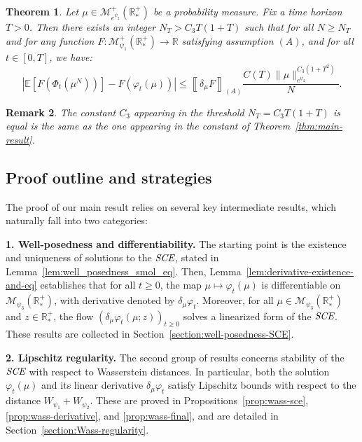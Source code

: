 \documentclass[11pt,a4paper]{article}
\newcommand{\RR}{\mathbb{R}}
\newcommand{\RRP}{\mathbb{R}^+_*}
\newcommand{\MC}{\mathcal{M}}
\newcommand{\SCE}{\emph{SCE}}
\newcommand{\A}{(A)}
\newcommand{\Proc}[1]{\left(#1\right)_{t\geq 0}}
\newtheorem{theorem}{Theorem}[section]
\newtheorem{remark}[theorem]{Remark}
\begin{document}
\begin{theorem}\label{thm:main-result-2}
    Let $\mu \in \MC^+_{e^{\psi_2}}(\RRP)$ be a probability measure. Fix a time horizon $T > 0$. Then there exists an integer $N_T > C_3 T(1 + T)$ such that for all $N \geq N_T$ and for any function \(F : \MC^+_{\psi_1}(\RRP) \to \RR\) satisfying assumption \(\A\), and for all \(t \in [0, T]\), we have:
    \[
    \left| \mathbb{E}\left[F\left(\Phi_t\left(\mu^N\right)\right)\right] - F\left(\varphi_t(\mu)\right) \right| \leq \left\llbracket \delta_\mu F \right\rrbracket_{\A}  \frac{C(T) \|\mu\|_{e^{\psi_2}}^{C_3 (1 + T^2)}}{N}.
    \]
\end{theorem}

\begin{remark}
    The constant $C_3$ appearing in the threshold $N_T = C_3T(1 + T)$ is equal is the same as the one appearing in the constant of Theorem~\ref{thm:main-result}.
\end{remark}


\subsection{Proof outline and strategies}
The proof of our main result relies on several key intermediate results, which naturally fall into two categories:

\textbf{1. Well-posedness and differentiability.} The starting point is the existence and uniqueness of solutions to the $\SCE$, stated in Lemma~\ref{lem:well_posedness_smol_eq}. Then, Lemma~\ref{lem:derivative-existence-and-eq} establishes that for all $t \geq 0$, the map $\mu \mapsto \varphi_t(\mu)$ is differentiable on $\MC_{\psi_3}(\RRP)$, with derivative denoted by $\delta_\mu \varphi_t$. Moreover, for all $\mu \in \MC_{\psi_3}(\RRP)$ and $z \in \RRP$, the flow $\Proc{\delta_\mu \varphi_t(\mu;z)}$ solves a linearized form of the $\SCE$. These results are collected in Section~\ref{section:well-posedness-SCE}.

\textbf{2. Lipschitz regularity.} The second group of results concerns stability of the $\SCE$ with respect to Wasserstein distances. In particular, both the solution $\varphi_t(\mu)$ and its linear derivative $\delta_\mu \varphi_t$ satisfy Lipschitz bounds with respect to the distance $W_{\psi_1} + W_{\psi_2}$. These are proved in Propositions~\ref{prop:wass-sce}, \ref{prop:wass-derivative}, and \ref{prop:wass-final}, and are detailed in Section~\ref{section:Wass-regularity}.

\medskip
\end{document}
